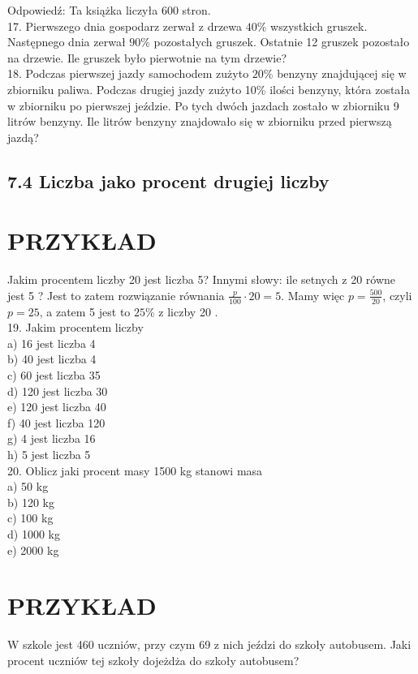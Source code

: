 \documentclass[10pt]{article}
\begin{document}
Odpowiedź: Ta książka liczyła 600 stron.\\
17. Pierwszego dnia gospodarz zerwał z drzewa \(40 \%\) wszystkich gruszek. Następnego dnia zerwał \(90 \%\) pozostałych gruszek. Ostatnie 12 gruszek pozostało na drzewie. Ile gruszek było pierwotnie na tym drzewie?\\
18. Podczas pierwszej jazdy samochodem zużyto \(20 \%\) benzyny znajdującej się w zbiorniku paliwa. Podczas drugiej jazdy zużyto 10\% ilości benzyny, która została w zbiorniku po pierwszej jeździe. Po tych dwóch jazdach zostało w zbiorniku 9 litrów benzyny. Ile litrów benzyny znajdowało się w zbiorniku przed pierwszą jazdą?

\subsection*{7.4 Liczba jako procent drugiej liczby}
\section*{PRZYKŁAD}
Jakim procentem liczby 20 jest liczba 5? Innymi słowy: ile setnych z 20 równe jest 5 ? Jest to zatem rozwiązanie równania \(\frac{p}{100} \cdot 20=5\). Mamy więc \(p=\frac{500}{20}\), czyli \(p=25\), a zatem 5 jest to \(25 \%\) z liczby 20 .\\
19. Jakim procentem liczby\\
a) 16 jest liczba 4\\
b) 40 jest liczba 4\\
c) 60 jest liczba 35\\
d) 120 jest liczba 30\\
e) 120 jest liczba 40\\
f) 40 jest liczba 120\\
g) 4 jest liczba 16\\
h) 5 jest liczba 5\\
20. Oblicz jaki procent masy 1500 kg stanowi masa\\
a) 50 kg\\
b) 120 kg\\
c) 100 kg\\
d) 1000 kg\\
e) 2000 kg

\section*{PRZYKŁAD}
W szkole jest 460 uczniów, przy czym 69 z nich jeździ do szkoły autobusem. Jaki procent uczniów tej szkoły dojeżdża do szkoły autobusem?
\end{document}

